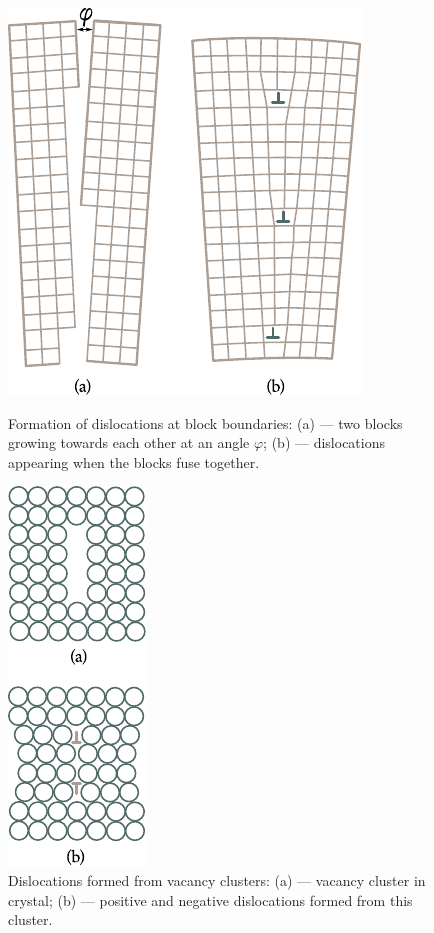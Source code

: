 \begin{figure}[t]
	\begin{minipage}[t]{0.51\linewidth}
		\begin{center}
			\includegraphics[scale=1]{figures/ch_02/fig_2_19.pdf}
			\caption[]{Formation of dislocations at block boundaries: (a) --- two blocks growing towards each other at an angle $\varphi$; (b) --- dislocations appearing when the blocks fuse together.}
			\label{fig:2_19}
		\end{center}
	\end{minipage}
	\hfill{ }%
	\begin{minipage}[t]{0.44\linewidth}
		\begin{center}
			\includegraphics[scale=1]{figures/ch_02/fig_2_20v.pdf}
			\caption[]{Dislocations formed from vacancy clusters: (a) --- vacancy cluster in crystal; (b) --- positive and negative dislocations formed from this cluster.}
			\label{fig:2_20}
		\end{center}
	\end{minipage}
\vspace{-0.3cm}
\end{figure}


